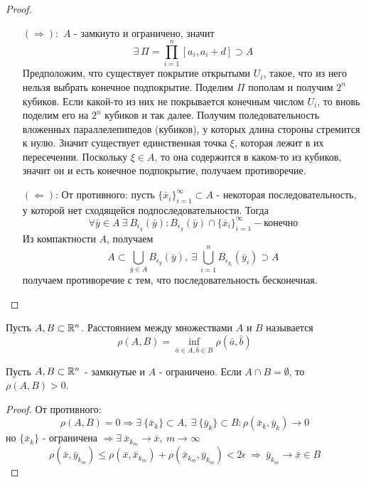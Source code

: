 \begin{proof}\tab
    \begin{itemize}
        \item[$(\Rightarrow):$] $A$ - замкнуто и ограничено, значит
        \[\exists\ \Pi=\prod\limits_{i=1}^{n}[a_i, a_i+d]\supset A\] 
        Предположим, что существует покрытие открытыми $U_i$, такое, что из него нельзя выбрать конечное подпокрытие. Поделим $\Pi$ пополам и получим $2^n$ кубиков. Если какой-то из них не покрывается конечным числом $U_i$, то вновь поделим его на $2^n$ кубиков и так далее. Получим поледовательность вложенных параллелепипедов (кубиков), у которых длина стороны стремится к нулю. Значит существует единственная точка $\xi$, которая лежит в их пересечении. Поскольку $\xi \in A$, то она содержится в каком-то из кубиков, значит он и есть конечное подпокрытие, получаем противоречие. 
        \item[$(\Leftarrow)$:] От противного: пусть $\{\bar{x}_i\}_{i=1}^{\infty}\subset A$ - некоторая последовательность, у которой нет сходящейся подпоследовательности. Тогда 
        \[\forall \bar{y}\in A\ \exists\ B_{\epsilon_y}(\bar{y}): B_{\epsilon_y}(\bar{y})\cap \{\bar{x}_i\}_{i=1}^{\infty} - \text{конечно}\]
        Из компактности $A$, получаем
        \[A\subset \bigcup_{\bar{y}\in A}B_{\epsilon_{\bar{y}}}(\bar{y}),\ \exists\ \bigcup_{i=1}^n B_{\epsilon_{y_i}}(\bar{y}_i)\supset A\]
        получаем противоречие с тем, что последовательность бесконечная.
    \end{itemize}
\end{proof} 
\begin{definition}
    Пусть $A,B\subset \mathbb{R}^n$. Расстоянием между множествами $A$ и $B$ называется 
    \[\rho(A,B)=\inf\limits_{\bar{a}\in A,\bar{b}\in B}\rho(\bar{a}, \bar{b})\]
\end{definition} 
\begin{theorem}
    Пусть $A,B \subset \mathbb{R}^n$ - замкнутые и $A$ - ограничено. Если $A\cap B=\emptyset$, то $\rho(A,B)>0$. 
\end{theorem} 
\begin{proof}
    От противного:
    \[\rho(A,B)=0 \Rightarrow \exists\ \{\bar{x}_k\}\subset A,\ \exists\ \{\bar{y}_k\}\subset B: \rho(\bar{x}_k, \bar{y}_k)\to 0\] 
    но $\{\bar{x}_k\}$ - ограничена $\Rightarrow \exists\ \bar{x}_{k_m}\to \bar{x},\ m\to \infty$
    \[\rho(\bar{x}, \bar{y}_{k_m})\leq \rho(\bar{x}, \bar{x}_{k_m})+\rho(\bar{x}_{k_m}, \bar{y}_{k_m})<2\epsilon\ \Rightarrow\ \bar{y}_{k_m}\to \bar{x}\in B\]
\end{proof}

